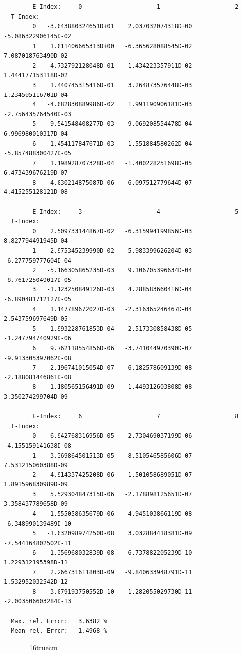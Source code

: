 \documentclass[12pt,dvips]{article}
\begin{document}
\begin{small}\begin{verbatim}


        E-Index:     0                     1                     2
  T-Index:
        0   -3.043880324651D+01    2.037032074318D+00   -5.086322906145D-02
        1    1.011406665313D+00   -6.365628088545D-02    7.087018763490D-02
        2   -4.732792128048D-01   -1.434223357911D-02    1.444177153118D-02
        3    1.440745315416D-01    3.264873576448D-03    1.234505116701D-04
        4   -4.082830889986D-02    1.991190906181D-03   -2.756435764540D-03
        5    9.541548408277D-03   -9.069208554478D-04    6.996980010317D-04
        6   -1.454117847671D-03    1.551884580262D-04   -5.857488300427D-05
        7    1.198928707328D-04   -1.400228251698D-05    6.473439676219D-07
        8   -4.030214875087D-06    6.097512779644D-07    4.415255128121D-08

        E-Index:     3                     4                     5
  T-Index:
        0    2.509733144867D-02   -6.315994199856D-03    8.827794491945D-04
        1   -2.975345239990D-02    5.983399626204D-03   -6.277759777604D-04
        2   -5.166305865235D-03    9.106705396634D-04   -8.761725049017D-05
        3   -1.123250849126D-03    4.288583660416D-04   -6.890481712127D-05
        4    1.147789672027D-03   -2.316365246467D-04    2.543759697649D-05
        5   -1.993228761853D-04    2.517330858438D-05   -1.247794740929D-06
        6    9.762118554856D-06   -3.741044970390D-07   -9.913305397062D-08
        7    2.196741015054D-07    6.182578609139D-08   -2.188081446861D-08
        8   -1.180565156491D-09   -1.449312603808D-08    3.350274299704D-09

        E-Index:     6                     7                     8
  T-Index:
        0   -6.942768316956D-05    2.730469037199D-06   -4.155159141638D-08
        1    3.369864501513D-05   -8.510546585606D-07    7.531215060388D-09
        2    4.914337425208D-06   -1.501058689051D-07    1.891596830989D-09
        3    5.529304847315D-06   -2.178898125651D-07    3.358437789658D-09
        4   -1.555058635679D-06    4.945103866119D-08   -6.348990139489D-10
        5   -1.032098974250D-08    3.032884418381D-09   -7.544164802502D-11
        6    1.356968032839D-08   -6.737882205239D-10    1.229312195398D-11
        7    2.266731611803D-09   -9.840633948791D-11    1.532952032542D-12
        8   -3.079193750552D-10    1.282055029730D-11   -2.003506603284D-13

  Max. rel. Error:   3.6382 %
  Mean rel. Error:   1.4968 %

\end{verbatim}\end{small}
\begin{figure} \label{7.2d}
\epsfxsize=16truecm
\end{figure}
\newpage
\end{document}
